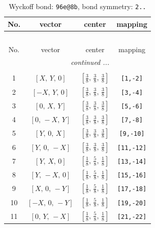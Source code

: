 \documentclass[fleqn,8pt]{jsarticle}
\begin{document}
\begin{longtable}{cccc}
\caption{Wyckoff bond: {\tt 96e@8b}, bond symmetry: {\tt 2..}}
 \\
 \hline \hline
No. & vector & center & mapping \\ \hline \endfirsthead

\multicolumn{3}{l}{\tablename\ \thetable{}} \\
 \hline \hline
No. & vector & center & mapping \\ \hline \endhead

 \hline \hline
\multicolumn{3}{r}{\footnotesize\it continued ...} \\ \endfoot

 \hline \hline
\multicolumn{3}{r}{} \\ \endlastfoot

1 & $\left[ X,\, Y,\, 0 \right]$ & $\left[ \frac{3}{8},\, \frac{3}{8},\, \frac{3}{8} \right]$ & {\tt [1,-2]} \\ \hline
2 & $\left[ - X,\, Y,\, 0 \right]$ & $\left[ \frac{3}{8},\, \frac{3}{8},\, \frac{3}{8} \right]$ & {\tt [3,-4]} \\ \hline
3 & $\left[ 0,\, X,\, Y \right]$ & $\left[ \frac{3}{8},\, \frac{3}{8},\, \frac{3}{8} \right]$ & {\tt [5,-6]} \\ \hline
4 & $\left[ 0,\, - X,\, Y \right]$ & $\left[ \frac{3}{8},\, \frac{3}{8},\, \frac{3}{8} \right]$ & {\tt [7,-8]} \\ \hline
5 & $\left[ Y,\, 0,\, X \right]$ & $\left[ \frac{3}{8},\, \frac{3}{8},\, \frac{3}{8} \right]$ & {\tt [9,-10]} \\ \hline
6 & $\left[ Y,\, 0,\, - X \right]$ & $\left[ \frac{3}{8},\, \frac{3}{8},\, \frac{3}{8} \right]$ & {\tt [11,-12]} \\ \hline
7 & $\left[ Y,\, X,\, 0 \right]$ & $\left[ \frac{1}{8},\, \frac{5}{8},\, \frac{1}{8} \right]$ & {\tt [13,-14]} \\ \hline
8 & $\left[ Y,\, - X,\, 0 \right]$ & $\left[ \frac{1}{8},\, \frac{5}{8},\, \frac{1}{8} \right]$ & {\tt [15,-16]} \\ \hline
9 & $\left[ X,\, 0,\, - Y \right]$ & $\left[ \frac{1}{8},\, \frac{5}{8},\, \frac{1}{8} \right]$ & {\tt [17,-18]} \\ \hline
10 & $\left[ - X,\, 0,\, - Y \right]$ & $\left[ \frac{1}{8},\, \frac{5}{8},\, \frac{1}{8} \right]$ & {\tt [19,-20]} \\ \hline
11 & $\left[ 0,\, Y,\, - X \right]$ & $\left[ \frac{1}{8},\, \frac{5}{8},\, \frac{1}{8} \right]$ & {\tt [21,-22]} \\ \hline

\end{longtable}
\end{document}
